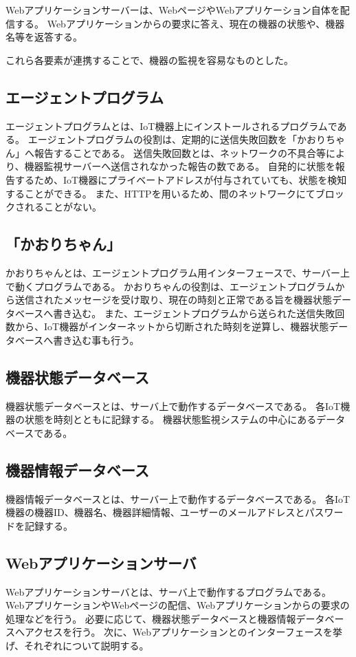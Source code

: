Webアプリケーションサーバーは、WebページやWebアプリケーション自体を配信する。
Webアプリケーションからの要求に答え、現在の機器の状態や、機器名等を返答する。
\medskip

これら各要素が連携することで、機器の監視を容易なものとした。

\subsection{エージェントプログラム}
エージェントプログラムとは、IoT機器上にインストールされるプログラムである。
エージェントプログラムの役割は、定期的に送信失敗回数を「かおりちゃん」へ報告することである。
送信失敗回数とは、ネットワークの不具合等により、機器監視サーバーへ送信されなかった報告の数である。
自発的に状態を報告するため、IoT機器にプライベートアドレスが付与されていても、状態を検知することができる。
また、HTTPを用いるため、間のネットワークにてブロックされることがない。

\subsection{「かおりちゃん」}
かおりちゃんとは、エージェントプログラム用インターフェースで、サーバー上で動くプログラムである。
かおりちゃんの役割は、エージェントプログラムから送信されたメッセージを受け取り、現在の時刻と正常である旨を機器状態データベースへ書き込む。
また、エージェントプログラムから送られた送信失敗回数から、IoT機器がインターネットから切断された時刻を逆算し、機器状態データベースへ書き込む事も行う。


\subsection{機器状態データベース}
機器状態データベースとは、サーバ上で動作するデータベースである。
各IoT機器の状態を時刻とともに記録する。
機器状態監視システムの中心にあるデータベースである。

\subsection{機器情報データベース}
機器情報データベースとは、サーバー上で動作するデータベースである。
各IoT機器の機器ID、機器名、機器詳細情報、ユーザーのメールアドレスとパスワードを記録する。

\subsection{Webアプリケーションサーバ}
Webアプリケーションサーバとは、サーバ上で動作するプログラムである。
WebアプリケーションやWebページの配信、Webアプリケーションからの要求の処理などを行う。
必要に応じて、機器状態データベースと機器情報データベースへアクセスを行う。
次に、Webアプリケーションとのインターフェースを挙げ、それぞれについて説明する。
